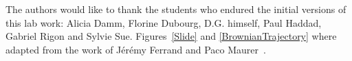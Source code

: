 \documentclass[%
 aip,
 jmp,%
 amsmath,amssymb,
reprint,%
]{revtex4-1}
\begin{document}

\begin{acknowledgments}
The authors would like to thank the students who endured the initial versions of this lab work: Alicia Damm, Florine Dubourg, D.G. himself, Paul Haddad, Gabriel Rigon and Sylvie Sue. Figures~\ref{Slide} and \ref{BrownianTrajectory} where adapted from the work of Jérémy Ferrand and Paco Maurer~\cite{Maurer2014}.
\end{acknowledgments}




\end{document}
